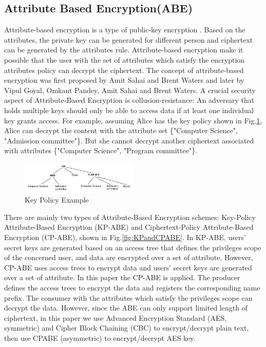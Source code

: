 \subsection{Attribute Based Encryption(ABE)}
Attribute-based encryption is a type of public-key encryption \cite{brucker2010attribute}. Based on the attributes, the private key can be generated for different person and ciphertext can be generated by the attributes rule. Attribute-based encryption make it possible that the user with the set of attributes which satisfy the encryption attributes policy can decrypt the ciphertext. The concept of attribute-based encryption was first proposed by Amit Sahai and Brent Waters \cite{sahai2005fuzzy} and later by Vipul Goyal, Omkant Pandey, Amit Sahai and Brent Waters\cite{goyal2006attribute}. A crucial security aspect of Attribute-Based Encryption is collusion-resistance: An adversary that holds multiple keys should only be able to access data if at least one individual key grants access. For example, assuming Alice has the key policy shown in Fig.\ref{fig:abeKey}, Alice can decrypt the content with the attribute set \{"Computer Science", "Admission committee"\}. But she cannot decrypt another ciphertext associated with attributes \{"Computer Science", "Program committee"\}.

\begin{figure}
	\centering
	\includegraphics[width=0.5\textwidth]{Figures/ABEExample.png}
	\caption{Key Policy Example}
	\label{fig:abeKey}
\end{figure}

There are mainly two types of Attribute-Based Encryption schemes: Key-Policy Attribute-Based Encryption (KP-ABE)\cite{goyal2006attribute} and Ciphertext-Policy Attribute-Based Encryption (CP-ABE)\cite{bethencourt2007ciphertext}, shown in Fig.\ref{fig:KPandCPABE}. In KP-ABE, users' secret keys are generated based on an access tree that defines the privileges scope of the concerned user, and data are encrypted over a set of attribute. However, CP-ABE uses access trees to encrypt data and users' secret keys are generated over a set of attribute. In this paper the CP-ABE is applied. The producer defines the access trees to encrypt the data and registers the corresponding  name prefix. The consumer with the attributes which satisfy the privileges scope can decrypt the data. However, since the ABE can only support limited length of ciphertext, in this paper we use Advanced Encryption Standard (AES, symmetric) and Cipher Block Chaining (CBC) to encrypt/decrypt plain text, then use CPABE (asymmetric) to encrypt/decrypt AES key.

